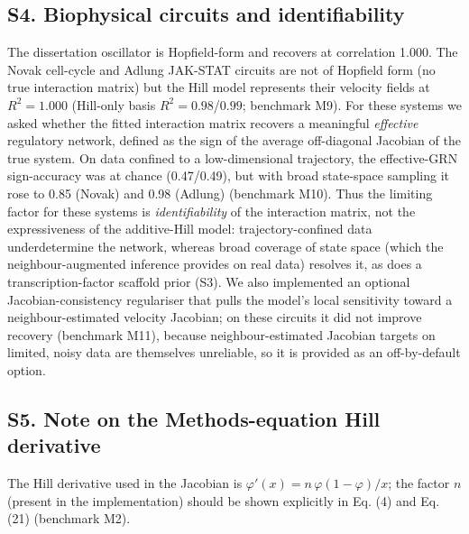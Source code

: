 \documentclass[11pt]{article}
\begin{document}
\subsection*{S4. Biophysical circuits and identifiability}
The dissertation oscillator is Hopfield-form and recovers at correlation 1.000. The Novak
cell-cycle and Adlung JAK-STAT circuits are not of Hopfield form (no true interaction
matrix) but the Hill model represents their velocity fields at $R^2=1.000$ (Hill-only basis
$R^2=0.98$/$0.99$; benchmark M9). For these systems we asked whether the fitted interaction
matrix recovers a meaningful \emph{effective} regulatory network, defined as the sign of the
average off-diagonal Jacobian of the true system. On data confined to a low-dimensional
trajectory, the effective-GRN sign-accuracy was at chance (0.47/0.49), but with broad
state-space sampling it rose to 0.85 (Novak) and 0.98 (Adlung) (benchmark M10). Thus the
limiting factor for these systems is \emph{identifiability} of the interaction matrix, not
the expressiveness of the additive-Hill model: trajectory-confined data underdetermine the
network, whereas broad coverage of state space (which the neighbour-augmented inference
provides on real data) resolves it, as does a transcription-factor scaffold prior (S3). We
also implemented an optional Jacobian-consistency regulariser that pulls the model's local
sensitivity toward a neighbour-estimated velocity Jacobian; on these circuits it did not
improve recovery (benchmark M11), because neighbour-estimated Jacobian targets on limited,
noisy data are themselves unreliable, so it is provided as an off-by-default option.

\subsection*{S5. Note on the Methods-equation Hill derivative}
The Hill derivative used in the Jacobian is $\varphi'(x)=n\,\varphi(1-\varphi)/x$; the
factor $n$ (present in the implementation) should be shown explicitly in Eq. (4) and
Eq. (21) (benchmark M2).
\end{document}
